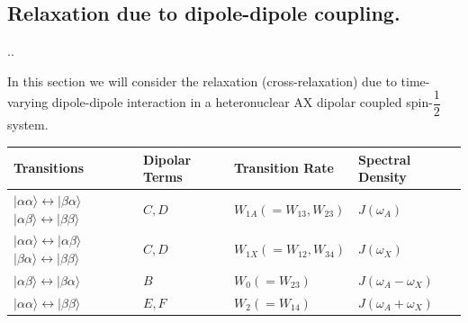 \documentclass[handout]{beamer}
\begin{document}
\subsection{Relaxation due to dipole-dipole coupling.}
\begin{frame}{\thesection.\thesubsection. \insertsubsection}

In this section we will consider the relaxation  (cross-relaxation)  due to time-varying dipole-dipole interaction in a heteronuclear AX dipolar coupled spin-$\dfrac{1}{2}$ system.

\begin{minipage}[t]{0.65\textwidth}
   \tiny{
	\begin{table}[ht]
		\centering
		\begin{tabular}{  C{2.0cm}  C{0.3cm}  C{1.5cm}  C{1.5cm}  }
			\hline\hline
			Transitions & Dipolar Terms & Transition Rate & Spectral Density \\  \hline
			$\mid \alpha \alpha \rangle \leftrightarrow \mid \beta \alpha \rangle$ \newline
			$\mid \alpha \beta \rangle \leftrightarrow \mid \beta \beta \rangle$
			& $C,D$ & $W_{1A}(=W_{13},W_{23})$ & $J(\omega_A)$  \\  \hline
			
			$\mid \alpha \alpha \rangle \leftrightarrow \mid \alpha \beta \rangle$ \newline
			$\mid \beta \alpha \rangle \leftrightarrow \mid \beta \beta \rangle$
			& $C,D$ & $W_{1X}(=W_{12},W_{34})$ & $J(\omega_X)$  \\  \hline
			
			$\mid \alpha \beta \rangle \leftrightarrow \mid \beta \alpha  \rangle$
			& $B$ & $W_{0}(=W_{23})$ & $J(\omega_A -\omega_X)$  \\  \hline
			
			$\mid \alpha \alpha \rangle \leftrightarrow \mid \beta \beta  \rangle$
			& $E,F$ & $W_{2}(=W_{14})$ & $J(\omega_A + \omega_X)$  \\  \hline
			

\end{tabular}
\end{table}}
\end{minipage}
\end{frame}
\end{document}

